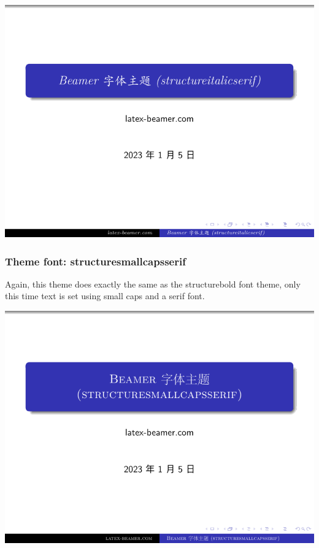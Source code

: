 \includegraphics[page=2]{examples/beamer/font-theme-structureitalicserif.pdf}

\subsubsection{Theme font: {\ttfamily structuresmallcapsserif}}

Again, this theme does exactly the same as the structurebold font theme, only this time text is set using small caps and a serif font.

\includegraphics[page=1]{examples/beamer/font-theme-structuresmallcapsserif.pdf}


